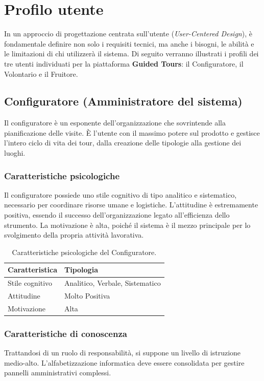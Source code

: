 \chapter{Profilo utente}
\label{cap:profilo_utente}

In un approccio di progettazione centrata sull'utente (\textit{User-Centered Design}), è fondamentale definire non solo i requisiti tecnici, ma anche i bisogni, le abilità e le limitazioni di chi utilizzerà il sistema. Di seguito verranno illustrati i profili dei tre utenti individuati per la piattaforma \textbf{Guided Tours}: il Configuratore, il Volontario e il Fruitore.

\section{Configuratore (Amministratore del sistema)}
Il configuratore è un esponente dell'organizzazione che sovrintende alla pianificazione delle visite. È l'utente con il massimo potere sul prodotto e gestisce l'intero ciclo di vita dei tour, dalla creazione delle tipologie alla gestione dei luoghi.

\subsection{Caratteristiche psicologiche}
Il configuratore possiede uno stile cognitivo di tipo analitico e sistematico, necessario per coordinare risorse umane e logistiche. L'attitudine è estremamente positiva, essendo il successo dell'organizzazione legato all'efficienza dello strumento. La motivazione è alta, poiché il sistema è il mezzo principale per lo svolgimento della propria attività lavorativa.

\begin{table}[H]
\centering
\begin{tabular}{|l|l|}
\hline
\textbf{Caratteristica} & \textbf{Tipologia} \\ \hline
Stile cognitivo & Analitico, Verbale, Sistematico \\ \hline
Attitudine & Molto Positiva \\ \hline
Motivazione & Alta \\ \hline
\end{tabular}
\caption{Caratteristiche psicologiche del Configuratore.}
\label{tab:conf_psicologiche}
\end{table}

\subsection{Caratteristiche di conoscenza}
Trattandosi di un ruolo di responsabilità, si suppone un livello di istruzione medio-alto. L'alfabetizzazione informatica deve essere consolidata per gestire pannelli amministrativi complessi.

